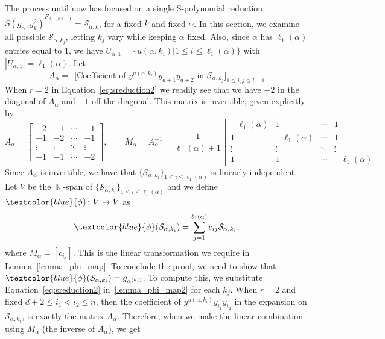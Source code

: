 \documentclass[10pt,a4paper]{article}
\def\field{\Bbbk}
\newcommand{\blue}[1]{\textcolor{blue}{#1}}
\begin{document}
The process until now has focused on a single S-polynomial reduction $\overline{S(g_\alpha, y_k^2)}^{F_{\ell_1(\alpha)-1}} =\mathcal{S}_{\alpha, k} $, for a fixed $k$ and fixed $\alpha$. In this section, we examine all possible $\mathcal{S}_{\alpha, k_{j}}$, letting $k_j$ vary while keeping $\alpha$ fixed. Also, since $\alpha$ has $\ell_1(\alpha)$ entries equal to 1, we have $U_{\alpha, 1}=\big\{u(\alpha,k_i)\big| 1\le i\le \ell_1(\alpha)\big\}$ with  $|U_{\alpha,1}| = \ell_1(\alpha)$. Let
   $$A_\alpha = \ \  \Big[ \text{Coefficient of } y^{u(\alpha, k_i)}y_{d+1}y_{d+2} \text{ in } \mathcal{S}_{\alpha,k_j} \Big]_{1 \leq i,j \leq l+1}$$
When $r=2$ in Equation~\eqref{eq:sreduction2} we readily see that we have $-2$ in the diagonal of $A_\alpha$ and $-1$ off the  diagonal. 
This matrix is invertible, given explicitly by
$$
    A_\alpha  =  
    \begin{bmatrix} -2 & -1 & \cdots  & -1 \\-1 & -2 &  \cdots & -1 \\  \vdots & \vdots & \ddots  & \vdots \\ -1 & -1 & \cdots & -2 \end{bmatrix},
    \qquad
    M_\alpha =A_\alpha^{-1}  = \frac{1}{\ell_1(\alpha)+1} 
    \begin{bmatrix} -\ell_1(\alpha) & 1 & \cdots  & 1 \\1 & -\ell_1(\alpha)& \cdots & 1 \\ \vdots & \vdots  & \ddots & \vdots \\ 1 & 1 & \cdots  & -\ell_1(\alpha)  \end{bmatrix}
$$
Since $A_\alpha$ is invertible, we have that $\{\mathcal{S}_{\alpha, k_i}\}_{1 \leq i \leq \ell_1(\alpha)}$ is linearly independent. Let $V$ be the $\field$-span of $\{\mathcal{S}_{\alpha, k_i}\}_{1 \leq i \leq \ell_1(\alpha)}$ and we define $\blue{\phi}\colon V \to  V$ as 
\begin{equation} \label{lemma_phi_map2}
    \blue{\phi} (\mathcal{S}_{\alpha, k_i}) = \sum_{j=1}^{\ell_1(\alpha)} c_{ij} \mathcal{S}_{\alpha, {k_{j}}},
\end{equation}
where $M_\alpha=[c_{ij}]$. This is the linear transformation we require in  Lemma~\ref{lemma_phi_map}. To conclude the proof, we need to show that  $\blue{\phi}(\mathcal{S}_{\alpha, k_i})  = g_{\alpha^{(k_i)}}$. To compute this, we substitute Equation~\eqref{eq:sreduction2} in~\eqref{lemma_phi_map2} for each $k_j$. When $r=2$ and fixed $d+2 \leq i_1 < i_2 \leq n$, then the coefficient of 
$y^{u(\alpha, k_i)} y_{i_1} y_{i_2}$ in the expansion on $\mathcal{S}_{\alpha, k_i}$, is exactly the matrix $A_\alpha$. Therefore, when we make the linear combination using $M_\alpha$ (the  inverse of $A_\alpha$), we get
\end{document}
